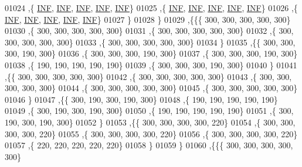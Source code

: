 \begin{DoxyCode}
01024    ,\{   \mbox{\hyperlink{1_88_84__epars_8h_a12c2040f25d8e3a7b9e1c2024c618cb6}{INF}},   \mbox{\hyperlink{1_88_84__epars_8h_a12c2040f25d8e3a7b9e1c2024c618cb6}{INF}},   \mbox{\hyperlink{1_88_84__epars_8h_a12c2040f25d8e3a7b9e1c2024c618cb6}{INF}},   \mbox{\hyperlink{1_88_84__epars_8h_a12c2040f25d8e3a7b9e1c2024c618cb6}{INF}},   \mbox{\hyperlink{1_88_84__epars_8h_a12c2040f25d8e3a7b9e1c2024c618cb6}{INF}}\}
01025    ,\{   \mbox{\hyperlink{1_88_84__epars_8h_a12c2040f25d8e3a7b9e1c2024c618cb6}{INF}},   \mbox{\hyperlink{1_88_84__epars_8h_a12c2040f25d8e3a7b9e1c2024c618cb6}{INF}},   \mbox{\hyperlink{1_88_84__epars_8h_a12c2040f25d8e3a7b9e1c2024c618cb6}{INF}},   \mbox{\hyperlink{1_88_84__epars_8h_a12c2040f25d8e3a7b9e1c2024c618cb6}{INF}},   \mbox{\hyperlink{1_88_84__epars_8h_a12c2040f25d8e3a7b9e1c2024c618cb6}{INF}}\}
01026    ,\{   \mbox{\hyperlink{1_88_84__epars_8h_a12c2040f25d8e3a7b9e1c2024c618cb6}{INF}},   \mbox{\hyperlink{1_88_84__epars_8h_a12c2040f25d8e3a7b9e1c2024c618cb6}{INF}},   \mbox{\hyperlink{1_88_84__epars_8h_a12c2040f25d8e3a7b9e1c2024c618cb6}{INF}},   \mbox{\hyperlink{1_88_84__epars_8h_a12c2040f25d8e3a7b9e1c2024c618cb6}{INF}},   \mbox{\hyperlink{1_88_84__epars_8h_a12c2040f25d8e3a7b9e1c2024c618cb6}{INF}}\}
01027    \}
01028   \}
01029  ,\{\{\{   300,   300,   300,   300,   300\}
01030    ,\{   300,   300,   300,   300,   300\}
01031    ,\{   300,   300,   300,   300,   300\}
01032    ,\{   300,   300,   300,   300,   300\}
01033    ,\{   300,   300,   300,   300,   300\}
01034    \}
01035   ,\{\{   300,   300,   300,   190,   300\}
01036    ,\{   300,   300,   300,   190,   300\}
01037    ,\{   300,   300,   300,   190,   300\}
01038    ,\{   190,   190,   190,   190,   190\}
01039    ,\{   300,   300,   300,   190,   300\}
01040    \}
01041   ,\{\{   300,   300,   300,   300,   300\}
01042    ,\{   300,   300,   300,   300,   300\}
01043    ,\{   300,   300,   300,   300,   300\}
01044    ,\{   300,   300,   300,   300,   300\}
01045    ,\{   300,   300,   300,   300,   300\}
01046    \}
01047   ,\{\{   300,   190,   300,   190,   300\}
01048    ,\{   190,   190,   190,   190,   190\}
01049    ,\{   300,   190,   300,   190,   300\}
01050    ,\{   190,   190,   190,   190,   190\}
01051    ,\{   300,   190,   300,   190,   300\}
01052    \}
01053   ,\{\{   300,   300,   300,   300,   220\}
01054    ,\{   300,   300,   300,   300,   220\}
01055    ,\{   300,   300,   300,   300,   220\}
01056    ,\{   300,   300,   300,   300,   220\}
01057    ,\{   220,   220,   220,   220,   220\}
01058    \}
01059   \}
01060  ,\{\{\{   300,   300,   300,   300,   300\}

\end{DoxyCode}
